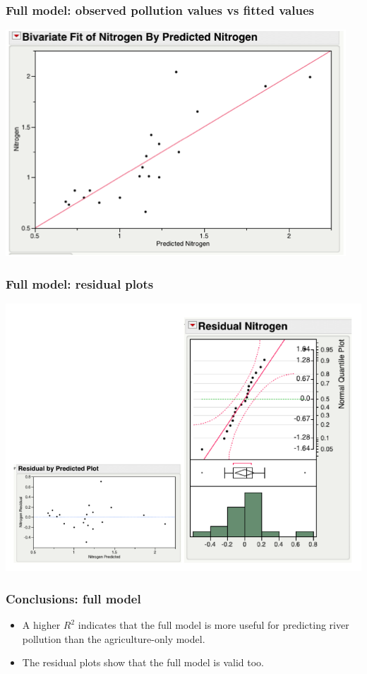 \documentclass[handout]{beamer}
\numberwithin{equation}{section}
\begin{document}
\begin{frame}
\frametitle{Full model: observed pollution values vs fitted values}
 \includegraphics{../../fig/riversfullmodelrealvsfit.png}
\end{frame}


\begin{frame}
\frametitle{Full model: residual plots}
 \includegraphics{../../fig/riversfullmodeldiag.png}
\end{frame}

\begin{frame}
\frametitle{Conclusions: full model}
\begin{itemize}
\pause \item A higher $R^2$ indicates that the full model is more useful for predicting river pollution than the agriculture-only model.
\pause \item The residual plots show that the full model is valid too.
\end{itemize}
\end{frame}
\end{document}
